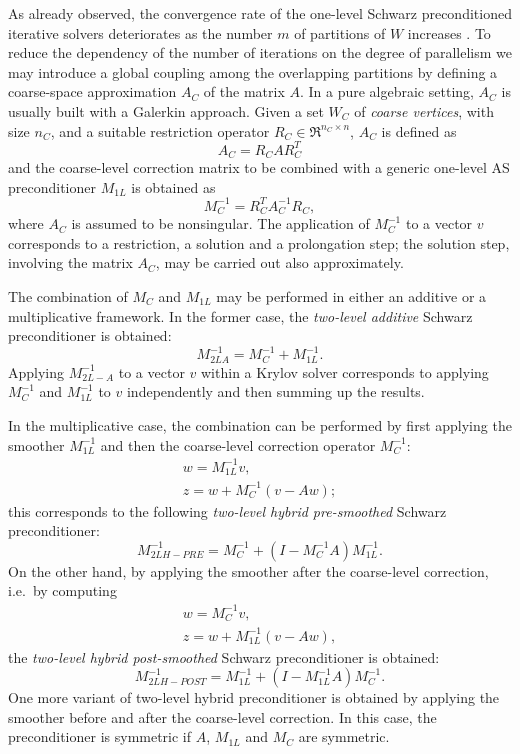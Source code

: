 As already observed, the convergence rate of the one-level Schwarz
preconditioned iterative solvers deteriorates as the number $m$ of partitions
of $W$ increases \cite{dd1_94,dd2_96}. To reduce the dependency
of the number of iterations on the degree of parallelism we may
introduce a global coupling among the overlapping partitions by defining 
a coarse-space approximation $A_C$ of the matrix $A$. 
In a pure algebraic setting, $A_C$ is usually built with
a Galerkin approach. Given a set $W_C$ of \emph{coarse vertices},
with size $n_C$, and a suitable restriction operator
$R_C \in \Re^{n_C \times n}$, $A_C$ is defined as
\[
A_C=R_C A R_C^T
\]
and the coarse-level correction matrix to be combined with a generic
one-level AS preconditioner $M_{1L}$ is obtained as
\[
M_{C}^{-1}= R_C^T A_C^{-1} R_C,
\]
where $A_C$ is assumed to be nonsingular. The application of $M_{C}^{-1}$
to a vector $v$ corresponds to a restriction, a solution and
a prolongation step; the solution step, involving the matrix $A_C$,
may be carried out also approximately.

The combination of $M_{C}$ and $M_{1L}$ may be
performed in either an additive or a multiplicative framework.
In the former case, the \emph{two-level additive} Schwarz preconditioner
is obtained:
\[
M_{2LA}^{-1} = M_{C}^{-1} + M_{1L}^{-1}. 
\]
Applying $M_{2L-A}^{-1}$ to a vector $v$ within a Krylov solver
corresponds to applying $M_{C}^{-1}$
and $M_{1L}^{-1}$ to $v$ independently and then summing up
the results.

In the multiplicative case, the combination can be
performed by first applying the smoother $M_{1L}^{-1}$ and then
the coarse-level correction operator $M_{C}^{-1}$:
\[
\begin{array}{l}
w = M_{1L}^{-1} v, \\
z = w + M_{C}^{-1} (v-Aw);
\end{array}
\]
this corresponds to the following \emph{two-level hybrid pre-smoothed}
Schwarz preconditioner:
\[
M_{2LH-PRE}^{-1} = M_{C}^{-1} + \left( I - M_{C}^{-1}A \right) M_{1L}^{-1}. 
\]
On the other hand, by applying the smoother after the coarse-level correction,
i.e.\ by computing
\[
\begin{array}{l}
w = M_{C}^{-1} v , \\
z = w + M_{1L}^{-1} (v-Aw) , 
\end{array}
\]
the \emph{two-level hybrid post-smoothed}
Schwarz preconditioner is obtained:
\[
M_{2LH-POST}^{-1} = M_{1L}^{-1} + \left( I - M_{1L}^{-1}A \right) M_{C}^{-1}. 
\]
One more variant of two-level hybrid preconditioner is obtained by applying
the smoother before and after the coarse-level correction. In this case, the
preconditioner is symmetric if $A$, $M_{1L}$ and $M_{C}$ are symmetric.

